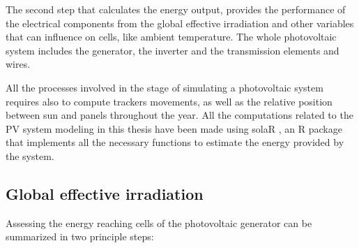 The second step that calculates the energy output, provides the performance of the electrical components from the global effective irradiation and other variables that can influence on cells, like ambient temperature. The whole photovoltaic system includes the generator, the inverter and the transmission elements and wires.



All the processes involved in the stage of simulating a photovoltaic system requires also to compute trackers movements, as well as the relative position between sun and panels throughout the year. All the computations related to the PV system modeling in this thesis have been made using solaR \cite*{Perpinan2012}, an R package that implements all the necessary functions to estimate the energy provided by the system.

\subsection{Global effective irradiation}

Assessing the energy reaching cells of the photovoltaic generator can be summarized in two principle steps:

